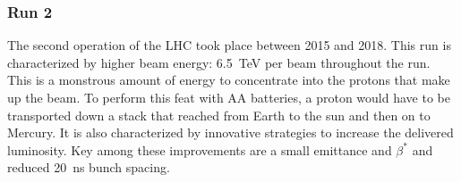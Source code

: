 
\subsubsection{Run 2}

The second operation of the LHC took place between 2015 and 2018.
This run is characterized by higher beam energy: 6.5~TeV per beam throughout the run.
This is a monstrous amount of energy to concentrate into the protons that make up the beam.
To perform this feat with AA batteries, a proton would have to be transported down a stack that reached from Earth to the sun and then on to Mercury.
It is also characterized by innovative strategies to increase the delivered luminosity.
Key among these improvements are a small emittance and $\beta^*$ and reduced 20~ns bunch spacing.

